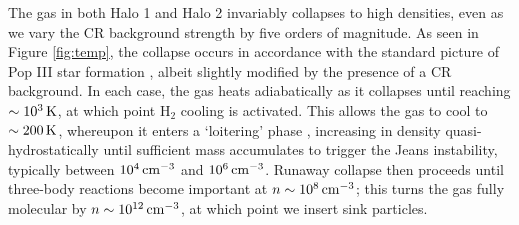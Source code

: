 \documentclass[usenatbib]{mn2e}
\newcommand{\kelvin}{\,{\rm K}}
\newcommand{\cc}{\,{\rm cm}^{-3}}
\newcommand{\htwo}{\mathrm{H}_2}
\begin{document}
The gas in both Halo 1 and Halo 2 invariably collapses to high densities, even as we vary the CR background strength by five orders of magnitude. 
As seen in Figure \ref{fig:temp}, the collapse occurs in accordance with the standard picture of Pop III star formation \citep[e.g.,][]{Greifetal2012,StacyBromm2013,Hiranoetal2014,Hosokawaetal2015}, albeit slightly modified by the presence of a CR background.  
In each case, the gas heats adiabatically as it collapses until reaching $\sim10^3\kelvin$, at which point $\htwo$ cooling is activated.  
This allows the gas to cool to $\sim200\kelvin$, whereupon it enters a `loitering' phase \citep{BrommCoppiLarson2002}, increasing in density quasi-hydrostatically until sufficient mass accumulates to trigger the Jeans instability, typically between $10^4\cc$ and $10^6\cc$. 
Runaway collapse then proceeds until three-body reactions become important at $n\sim10^8\cc$; this turns the gas fully molecular by $n\sim10^{12}\cc$, at which point we insert sink particles.
\end{document}

